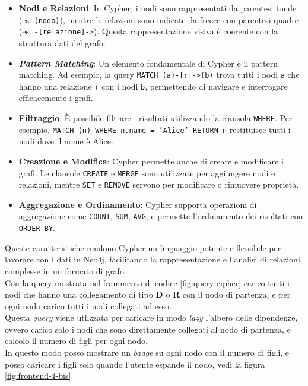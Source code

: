 \begin{itemize}
\item \textbf{Nodi e Relazioni}: In Cypher, i nodi sono rappresentati da parentesi tonde (es. \texttt{(nodo)}), 
mentre le relazioni sono indicate da frecce con parentesi quadre (es. \texttt{-[relazione]->}). Questa rappresentazione visiva è coerente con la struttura dati del grafo.

\item \textbf{\textit{Pattern Matching}}: Un elemento fondamentale di Cypher è il pattern matching. 
Ad esempio, la query \texttt{MATCH (a)-[r]->(b)} trova tutti i nodi \texttt{a} che hanno una relazione \texttt{r} con i nodi \texttt{b}, permettendo di navigare e interrogare efficacemente i grafi.

\item \textbf{Filtraggio}: È possibile filtrare i risultati utilizzando la clausola \texttt{WHERE}. 
Per esempio, \texttt{MATCH (n) WHERE n.name = 'Alice' RETURN n} restituisce tutti i nodi dove il nome è Alice.

\item \textbf{Creazione e Modifica}: Cypher permette anche di creare e modificare i grafi. 
Le clausole \texttt{CREATE} e \texttt{MERGE} sono utilizzate per aggiungere nodi e relazioni, mentre \texttt{SET} e \texttt{REMOVE} servono per modificare o rimuovere proprietà.

\item \textbf{Aggregazione e Ordinamento}: Cypher supporta operazioni di aggregazione come \texttt{COUNT}, \texttt{SUM}, 
\texttt{AVG}, e permette l'ordinamento dei risultati con \texttt{ORDER BY}.
\end{itemize}

Queste caratteristiche rendono Cypher un linguaggio potente e flessibile per lavorare con i dati in Neo4j, 
facilitando la rappresentazione e l'analisi di relazioni complesse in un formato di grafo.\\

Con la query mostrata nel frammento di codice \ref*{fig:query-cipher} carico tutti i nodi che hanno una collegamento di tipo \textbf{D} o \textbf{R} con il nodo di partenza,
e per ogni nodo carico tutti i nodi collegati ad esso.\\
Questa \textit{query} viene utilzzata per caricare in modo \textit{lazy} l'albero delle dipendenze, ovvero carico solo i nodi che sono direttamente collegati al nodo di partenza,
e calcolo il numero di figli per ogni nodo.\\ In questo modo posso mostrare un \textit{badge} su ogni nodo con il numero di figli, e posso caricare i figli solo quando l'utente espande il nodo, 
vedi la figura \ref{fig:frontend-4-bis}.\\

